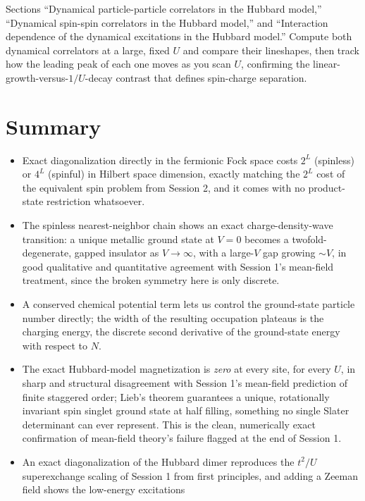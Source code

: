 \documentclass[all_sessions.tex]{subfiles}
\begin{document}
\begin{notebook}
Sections ``Dynamical particle-particle correlators in the Hubbard model,'' ``Dynamical spin-spin
correlators in the Hubbard model,'' and ``Interaction dependence of the dynamical excitations in
the Hubbard model.'' Compute both dynamical correlators at a large, fixed $U$ and compare their
lineshapes, then track how the leading peak of each one moves as you scan $U$, confirming the
linear-growth-versus-$1/U$-decay contrast that defines spin-charge separation.
\end{notebook}

\section*{Summary}
\begin{itemize}[nosep]
  \item Exact diagonalization directly in the fermionic Fock space costs $2^L$ (spinless) or $4^L$
    (spinful) in Hilbert space dimension, exactly matching the $2^L$ cost of the equivalent spin
    problem from Session 2, and it comes with no product-state restriction whatsoever.
  \item The spinless nearest-neighbor chain shows an exact charge-density-wave transition: a
    unique metallic ground state at $V=0$ becomes a twofold-degenerate, gapped insulator as
    $V\to\infty$, with a large-$V$ gap growing $\sim V$, in good qualitative and quantitative
    agreement with Session 1's mean-field treatment, since the broken symmetry here is only
    discrete.
  \item A conserved chemical potential term lets us control the ground-state particle number
    directly; the width of the resulting occupation plateaus is the charging energy, the discrete
    second derivative of the ground-state energy with respect to $N$.
  \item The exact Hubbard-model magnetization is \emph{zero} at every site, for every $U$, in
    sharp and structural disagreement with Session 1's mean-field prediction of finite staggered
    order; Lieb's theorem guarantees a unique, rotationally invariant spin singlet ground state at
    half filling, something no single Slater determinant can ever represent. This is the clean,
    numerically exact confirmation of mean-field theory's failure flagged at the end of Session 1.
  \item An exact diagonalization of the Hubbard dimer reproduces the $t^2/U$ superexchange scaling
    of Session 1 from first principles, and adding a Zeeman field shows the low-energy excitations

\end{itemize}
\end{document}
